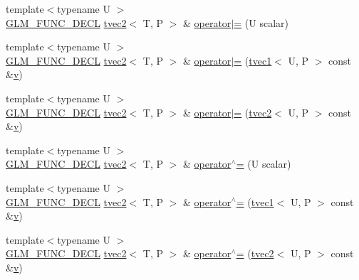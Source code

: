 \begin{DoxyCompactItemize}
\item 
{\footnotesize template$<$typename U $>$ }\\\mbox{\hyperlink{setup_8hpp_ab2d052de21a70539923e9bcbf6e83a51}{G\+L\+M\+\_\+\+F\+U\+N\+C\+\_\+\+D\+E\+CL}} \mbox{\hyperlink{structglm_1_1tvec2}{tvec2}}$<$ T, P $>$ \& \mbox{\hyperlink{structglm_1_1tvec2_a4992709adc592f1790beedc60d2089cd}{operator$\vert$=}} (U scalar)
\item 
{\footnotesize template$<$typename U $>$ }\\\mbox{\hyperlink{setup_8hpp_ab2d052de21a70539923e9bcbf6e83a51}{G\+L\+M\+\_\+\+F\+U\+N\+C\+\_\+\+D\+E\+CL}} \mbox{\hyperlink{structglm_1_1tvec2}{tvec2}}$<$ T, P $>$ \& \mbox{\hyperlink{structglm_1_1tvec2_a4cb8e942400c0ea18beb292a50c49958}{operator$\vert$=}} (\mbox{\hyperlink{structglm_1_1tvec1}{tvec1}}$<$ U, P $>$ const \&\mbox{\hyperlink{glad_8h_a14cfbe2fc2234f5504618905b69d1e06}{v}})
\item 
{\footnotesize template$<$typename U $>$ }\\\mbox{\hyperlink{setup_8hpp_ab2d052de21a70539923e9bcbf6e83a51}{G\+L\+M\+\_\+\+F\+U\+N\+C\+\_\+\+D\+E\+CL}} \mbox{\hyperlink{structglm_1_1tvec2}{tvec2}}$<$ T, P $>$ \& \mbox{\hyperlink{structglm_1_1tvec2_a2bb8b0876df3f551acf4dae3134e0d2e}{operator$\vert$=}} (\mbox{\hyperlink{structglm_1_1tvec2}{tvec2}}$<$ U, P $>$ const \&\mbox{\hyperlink{glad_8h_a14cfbe2fc2234f5504618905b69d1e06}{v}})
\item 
{\footnotesize template$<$typename U $>$ }\\\mbox{\hyperlink{setup_8hpp_ab2d052de21a70539923e9bcbf6e83a51}{G\+L\+M\+\_\+\+F\+U\+N\+C\+\_\+\+D\+E\+CL}} \mbox{\hyperlink{structglm_1_1tvec2}{tvec2}}$<$ T, P $>$ \& \mbox{\hyperlink{structglm_1_1tvec2_af338fe1420da86c655cb368cb8739667}{operator$^\wedge$=}} (U scalar)
\item 
{\footnotesize template$<$typename U $>$ }\\\mbox{\hyperlink{setup_8hpp_ab2d052de21a70539923e9bcbf6e83a51}{G\+L\+M\+\_\+\+F\+U\+N\+C\+\_\+\+D\+E\+CL}} \mbox{\hyperlink{structglm_1_1tvec2}{tvec2}}$<$ T, P $>$ \& \mbox{\hyperlink{structglm_1_1tvec2_a50b26c0a009d0ed134ae0984da6d50ab}{operator$^\wedge$=}} (\mbox{\hyperlink{structglm_1_1tvec1}{tvec1}}$<$ U, P $>$ const \&\mbox{\hyperlink{glad_8h_a14cfbe2fc2234f5504618905b69d1e06}{v}})
\item 
{\footnotesize template$<$typename U $>$ }\\\mbox{\hyperlink{setup_8hpp_ab2d052de21a70539923e9bcbf6e83a51}{G\+L\+M\+\_\+\+F\+U\+N\+C\+\_\+\+D\+E\+CL}} \mbox{\hyperlink{structglm_1_1tvec2}{tvec2}}$<$ T, P $>$ \& \mbox{\hyperlink{structglm_1_1tvec2_ac1398d1c0dbada005b4ed27a9a568c28}{operator$^\wedge$=}} (\mbox{\hyperlink{structglm_1_1tvec2}{tvec2}}$<$ U, P $>$ const \&\mbox{\hyperlink{glad_8h_a14cfbe2fc2234f5504618905b69d1e06}{v}})

\end{DoxyCompactItemize}
